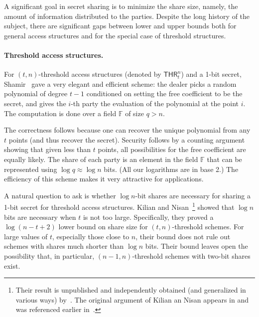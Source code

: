 \documentclass[11pt]{article}
\numberwithin{equation}{section}
\theoremstyle{definition}
\theoremstyle{plain}
\newcommand{\thr}[2]{\mathsf{THR}_{#1}^{#2}}
\newcommand\F{\mathbb F}
\begin{document}
A significant goal in secret sharing is to minimize the share size, namely, the
amount of information distributed to the parties. Despite the long history of the
subject, there are significant gaps between lower and upper bounds both
for general access structures and for the special case of threshold structures.

\paragraph{Threshold access structures.} For $(t,n)$-threshold access
structures (denoted by $\thr{t}{n}$) and a 1-bit secret, Shamir~\cite{Shamir79} gave a very elegant
and efficient scheme: the dealer picks a random polynomial of degree $t-1$
conditioned on setting the free coefficient to be the secret, and gives the
$i$-th party the evaluation of the polynomial at the point $i$. The computation
is done over a field $\F$ of size $q>n$.

The correctness follows because one can recover the unique polynomial from any
$t$ points (and thus recover the secret). Security follows by a counting
argument showing that given less than $t$ points, all possibilities for the free
coefficient are equally likely. The share of each party is an element in the
field $\F$ that can be represented using $\log q\approx \log n$ bits. (All our
logarithms are in base 2.) The efficiency of this scheme makes it very attractive
for applications.

A natural question to ask is whether $\log{n}$-bit shares are necessary
for sharing a 1-bit secret for threshold access structures. Kilian and
Nisan~\cite{KilianN90}\footnote{Their result is unpublished and independently
	obtained (and generalized in various ways) by~\cite{PueyoCX13}. The original
	argument of Kilian an Nisan appears in \cite[Appendix A]{PueyoCX13} and was
	referenced earlier in~\cite{BeimelC94,BeimelPHD,BeimelF07}.}  showed that
$\log n$ bits are necessary when $t$ is not too large. Specifically, they proved
a $\log(n-t+2)$ lower bound on share size for $(t,n)$-threshold
schemes.  For large values of $t$, especially those close to $n$, their
bound does not rule out schemes with shares much shorter than $\log n$ bits. Their
bound leaves open the possibility that, in particular, $(n-1,n)$-threshold schemes
with two-bit shares exist.  
\end{document}
